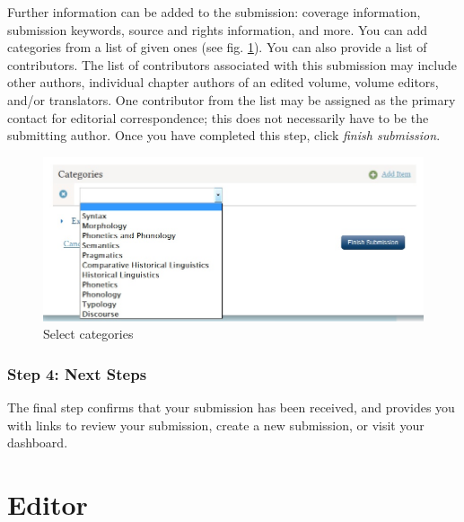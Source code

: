 Further information can be added to the submission: coverage information, submission keywords, source and rights information, and more. You can add categories from a list of given ones (see fig. \ref{fig:submission7}). You can also provide a list of contributors. The list of contributors associated with this submission may include other authors, individual chapter authors of an edited volume, volume editors, and/or translators. One contributor from the list may be assigned as the primary contact for editorial correspondence; this does not necessarily have to be the submitting author. Once you have completed this step, click \textit{finish submission}.

\begin{figure}[h] \centering 
\includegraphics[width=1\textwidth]{./img/submission-7.jpg} 
\caption{Select categories}
\label{fig:submission7}
\end{figure}

\subsection*{Step 4: Next Steps}

The final step confirms that your submission has been received, and provides you with links to review your submission, create a new submission, or visit your dashboard. 



\newpage


\chapter{Editor} \label{sec:editor}

